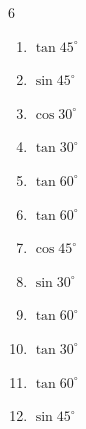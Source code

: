 \begin{multicols}{6}
\begin{enumerate}
  \item $\displaystyle \tan{45^\circ}$

        \phantom{$\displaystyle =1$}

\columnbreak %

\resetques

  \item $\displaystyle \sin{45^\circ}$


  \item $\displaystyle \cos{30^\circ}$


  \item $\displaystyle \tan{30^\circ}$


  \item $\displaystyle \tan{60^\circ}$


  \item $\displaystyle \tan{60^\circ}$


  \item $\displaystyle \cos{45^\circ}$


  \item $\displaystyle \sin{30^\circ}$


  \item $\displaystyle \tan{60^\circ}$


  \item $\displaystyle \tan{30^\circ}$


  \item $\displaystyle \tan{60^\circ}$


  \item $\displaystyle \sin{45^\circ}$



\end{enumerate}
\end{multicols}
